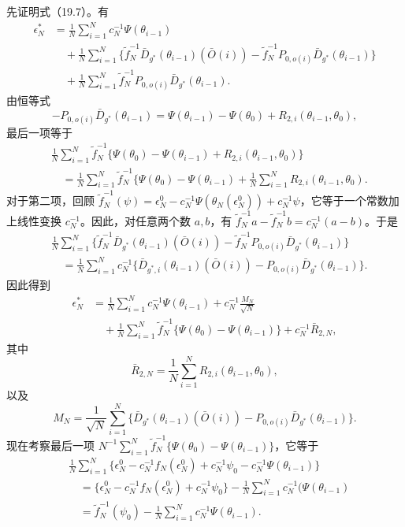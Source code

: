 先证明式（19.7）。有
\[
\begin{aligned}
 \epsilon_N^*&=\frac1N\sum_{i=1}^N c_N^{-1}\Psi(\theta_{i-1})\\
 &\quad+\frac1N\sum_{i=1}^N
 \{\tilde f_N^{-1}\bar D_{g^*}(\theta_{i-1})(\bar O(i))
 -\tilde f_N^{-1}P_{0,o(i)}\bar D_{g^*}(\theta_{i-1})\}\\
 &\quad+\frac1N\sum_{i=1}^N\tilde f_N^{-1}P_{0,o(i)}\bar D_{g^*}(\theta_{i-1}).
\end{aligned}
\]
由恒等式
\[
 -P_{0,o(i)}\bar D_{g^*}(\theta_{i-1})
 =\Psi(\theta_{i-1})-\Psi(\theta_0)+R_{2,i}(\theta_{i-1},\theta_0),
\]
最后一项等于
\[
\begin{aligned}
 &\frac1N\sum_{i=1}^N\tilde f_N^{-1}
 \{\Psi(\theta_0)-\Psi(\theta_{i-1})+R_{2,i}(\theta_{i-1},\theta_0)\}\\
 &\quad=\frac1N\sum_{i=1}^N\tilde f_N^{-1}
 \lbrace\Psi(\theta_0)-\Psi(\theta_{i-1})
 +\frac1N\sum_{i=1}^N R_{2,i}(\theta_{i-1},\theta_0).
\end{aligned}
\]
对于第二项，回顾 $\tilde f_N^{-1}(\psi)=\epsilon_N^0-c_N^{-1}\Psi(\theta_N(\epsilon_N^0))+c_N^{-1}\psi$，它等于一个常数加上线性变换 $c_N^{-1}$。因此，对任意两个数 $a,b$，有 $\tilde f_N^{-1}a-\tilde f_N^{-1}b=c_N^{-1}(a-b)$。于是
\[
\begin{aligned}
 &\frac1N\sum_{i=1}^N
 \{\tilde f_N^{-1}\bar D_{g^*}(\theta_{i-1})(\bar O(i))
 -\tilde f_N^{-1}P_{0,o(i)}\bar D_{g^*}(\theta_{i-1})\}\\
 &\quad=\frac1N\sum_{i=1}^N c_N^{-1}
 \{\bar D_{g^*,i}(\theta_{i-1})(\bar O(i))
 -P_{0,o(i)}\bar D_{g^*}(\theta_{i-1})\}.
\end{aligned}
\]
因此得到
\[
\begin{aligned}
 \epsilon_N^*&=\frac1N\sum_{i=1}^N c_N^{-1}\Psi(\theta_{i-1})
 +c_N^{-1}\frac{M_N}{\sqrt N}\\
 &\quad+\frac1N\sum_{i=1}^N\tilde f_N^{-1}
 \{\Psi(\theta_0)-\Psi(\theta_{i-1})\}+c_N^{-1}\bar R_{2,N},
\end{aligned}
\]
其中
\[
 \bar R_{2,N}=\frac1N\sum_{i=1}^N R_{2,i}(\theta_{i-1},\theta_0),
\]
以及
\[
 M_N=\frac1{\sqrt N}\sum_{i=1}^N
 \{\bar D_{g^*}(\theta_{i-1})(\bar O(i))-P_{0,o(i)}\bar D_{g^*}(\theta_{i-1})\}.
\]
现在考察最后一项 $N^{-1}\sum_{i=1}^N\tilde f_N^{-1}\{\Psi(\theta_0)-\Psi(\theta_{i-1})\}$，它等于
\[
\begin{aligned}
 &\frac1N\sum_{i=1}^N
 \{\epsilon_N^0-c_N^{-1}f_N(\epsilon_N^0)+c_N^{-1}\psi_0-c_N^{-1}\Psi(\theta_{i-1})\}\\
 &\quad=\{\epsilon_N^0-c_N^{-1}f_N(\epsilon_N^0)+c_N^{-1}\psi_0\}
 -\frac1N\sum_{i=1}^N c_N^{-1}(\Psi(\theta_{i-1})\\
 &\quad=\tilde f_N^{-1}(\psi_0)-\frac1N\sum_{i=1}^N c_N^{-1}\Psi(\theta_{i-1}).
\end{aligned}
\]
